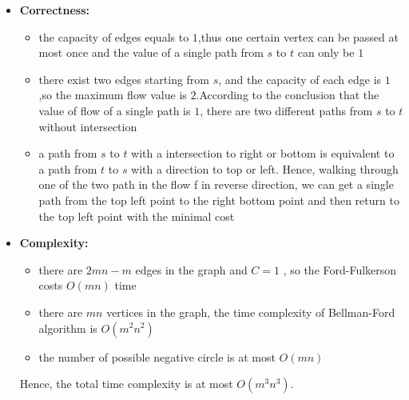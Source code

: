 \begin{itemize}
	\item \textbf{Correctness:} \\
	 \begin{itemize}
	 	\item the capacity of edges equals to $1$,thus one certain vertex can be passed at most once and the value of a single path from $s$ to $t$ can only be $1$
	 	\item there exist two edges starting from $s$, and the capacity of each edge is $1$,so the maximum flow value is $2$.According to the conclusion that the value of flow of a single path is $1$, there are two different paths from $s$ to $t$ without intersection
	 \item a path from $s$ to $t$ with a intersection to right or bottom is equivalent to a path from $t$ to $s$ with a direction to top or left. Hence, walking through one of the two path in the flow f in reverse direction, we can get a single path from the top left point to the right bottom point and then return to the top left point with the minimal cost	 
	 \end{itemize}
	\item \textbf{Complexity:} \\
	 \begin{itemize}
	 	\item there are $2mn-m$ edges in the graph and $C=1$ ,
		 	so the Ford-Fulkerson costs $O(mn)$ time
		 \item there are $mn$ vertices in the graph, the time complexity of Bellman-Ford algorithm is $O(m^2n^2)$	
		\item the number of possible negative circle is at most $O(mn)$
	 \end{itemize}
	 Hence, the total time complexity is at most $O(m^3n^3)$.
\end{itemize} 